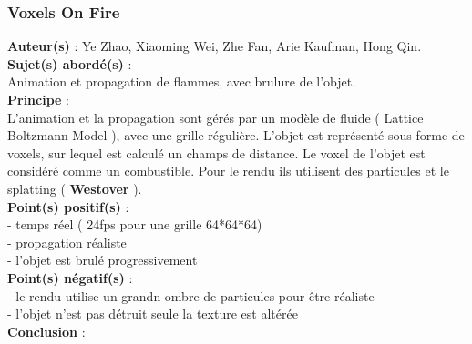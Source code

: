 \documentclass[a4paper,10pt]{article}
\begin{document}
\subsubsection{Voxels On Fire}
\textbf{Auteur(s)} : Ye Zhao, Xiaoming Wei, Zhe Fan, Arie Kaufman, Hong Qin.\\
\textbf{Sujet(s) abordé(s)} : \\  Animation et propagation de flammes, avec brulure de l'objet.\\
\textbf{Principe} :\\ L'animation et la propagation sont gérés par un modèle de fluide ( Lattice Boltzmann Model ), avec une grille régulière. L'objet est représenté sous forme de voxels, sur lequel est calculé un champs de distance. Le voxel de l'objet est considéré comme un combustible. Pour le rendu ils utilisent des particules et le splatting ( \textbf{Westover} ).\\
\textbf{Point(s) positif(s)} :\\
    - temps réel ( 24fps pour une grille 64*64*64)\\
    - propagation réaliste\\
    - l'objet est brulé progressivement\\
\textbf{Point(s) négatif(s)} :\\
    - le rendu utilise un grandn ombre de particules pour être réaliste\\
    - l'objet n'est pas détruit seule la texture est altérée\\
\textbf{Conclusion} :\\
\end{document}

